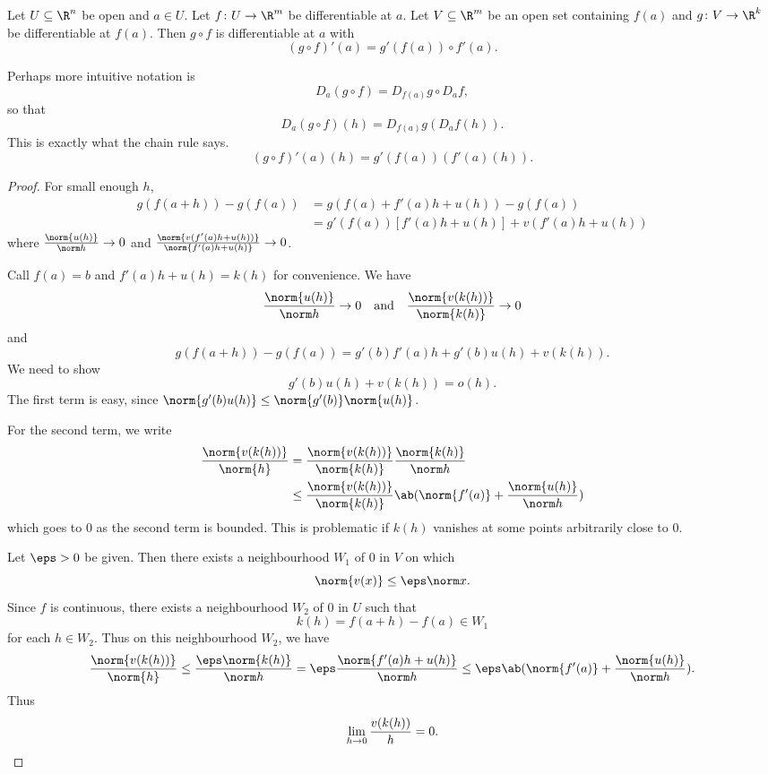 \begin{proposition*} \label{thm:chain}
    Let $U \subseteq \R^n$ be open and $a \in U$.
    Let $f\colon U \to \R^m$ be differentiable at $a$.
    Let $V \subseteq \R^m$ be an open set containing $f(a)$
    and $g\colon V \to \R^k$ be differentiable at $f(a)$.
    Then $g \circ f$ is differentiable at $a$ with \[
        (g \circ f)'(a) = g'(f(a)) \circ f'(a).
    \]
\end{proposition*}
Perhaps more intuitive notation is \[
    D_a(g \circ f) = D_{f(a)} g \circ D_a f,
\] so that \[
    D_a(g \circ f)(h) = D_{f(a)} g(D_a f(h)).
\] This is exactly what the chain rule says.
\[
    (g \circ f)'(a)(h) = g'(f(a))(f'(a)(h)).
\]
\begin{proof}
    For small enough $h$, \begin{align*}
        g(f(a + h)) - g(f(a))
            &= g(f(a) + f'(a)h + u(h)) - g(f(a)) \\
            &= g'(f(a))[f'(a)h + u(h)] + v(f'(a)h + u(h))
    \end{align*}
    where $\frac{\norm{u(h)}}{\norm h} \to 0$ and
    $\frac{\norm{v(f'(a)h + u(h))}}{\norm{f'(a)h + u(h)}} \to 0$.

    Call $f(a) = b$ and $f'(a)h + u(h) = k(h)$ for convenience.
    We have \[
        \frac{\norm{u(h)}}{\norm h} \to 0
        \quad \text{and} \quad
        \frac{\norm{v(k(h))}}{\norm{k(h)}} \to 0
    \] and \[
        g(f(a + h)) - g(f(a)) = g'(b)f'(a)h + g'(b)u(h) + v(k(h)).
    \] We need to show \[
        g'(b) u(h) + v(k(h)) = o(h).
    \] The first term is easy, since
    $\norm{g'(b)u(h)} \le \norm{g'(b)} \norm{u(h)}$.

    For the second term, we write \begin{align*}
        \frac{\norm{v(k(h))}}{\norm{h}}
            &= \frac{\norm{v(k(h))}}{\norm{k(h)}}
                \frac{\norm{k(h)}}{\norm h} \\
            &\le \frac{\norm{v(k(h))}}{\norm{k(h)}}
                \ab(\norm{f'(a)} + \frac{\norm{u(h)}}{\norm h})
    \end{align*} which goes to $0$ as the second term is bounded.
    This is problematic if $k(h)$ vanishes at some points
    arbitrarily close to $0$.

    Let $\eps > 0$ be given.
    Then there exists a neighbourhood $W_1$ of $0$ in $V$ on which \[
        \norm{v(x)} \le \eps \norm x.
    \] Since $f$ is continuous, there exists a neighbourhood $W_2$ of $0$
    in $U$ such that \[
        k(h) = f(a + h) - f(a) \in W_1
    \] for each $h \in W_2$.
    Thus on this neighbourhood $W_2$, we have \[
        \frac{\norm{v(k(h))}}{\norm{h}}
        \le \frac{\eps \norm{k(h)}}{\norm h}
        = \eps \frac{\norm{f'(a)h + u(h)}}{\norm h}
        \le \eps \ab(\norm{f'(a)} + \frac{\norm{u(h)}}{\norm h}).
    \] Thus \[
        \lim_{h \to 0} \frac{v(k(h))}{h} = 0. \qedhere
    \]
\end{proof}
